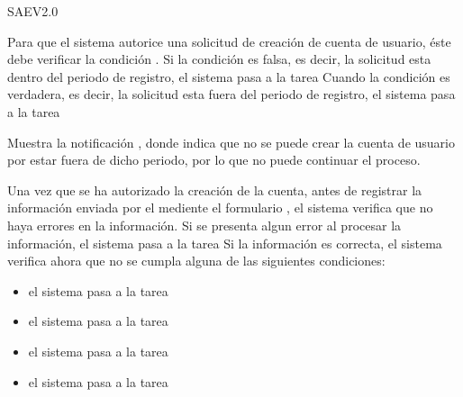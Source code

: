 \begin{PDescripcion}
\begin{enumerate}
    \end{enumerate}

  \Ppaso SAEV2.0

    \begin{enumerate}

      \Ppaso[\itarea]  Para que el sistema autorice una solicitud de creación de cuenta de usuario, éste debe verificar la condición . Si la condición es falsa, es decir, la solicitud esta dentro del periodo de registro, el sistema pasa a la tarea  Cuando la condición es verdadera, es decir, la solicitud esta fuera del periodo de registro, el sistema pasa a la tarea 

      \Ppaso[\itarea]  Muestra la notificación , donde indica que no se puede crear la cuenta de usuario por estar fuera de dicho periodo, por lo que no puede continuar el proceso.

      \Ppaso[\itarea]  Una vez que se ha autorizado la creación de la cuenta, antes de registrar la información enviada por el  mediente el formulario , el sistema verifica que no haya errores en la información. Si se presenta algun error al procesar la información, el sistema pasa a la tarea  Si la información es correcta, el sistema verifica ahora que no se cumpla alguna de las siguientes condiciones:

	\begin{itemize}
	  \item {} el sistema pasa a la tarea 
	  \item {} el sistema pasa a la tarea  
	  \item {} el sistema pasa a la tarea  
	  \item {} el sistema pasa a la tarea 
	\end{itemize}


\end{enumerate}
\end{PDescripcion}

